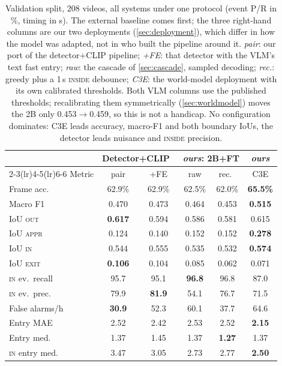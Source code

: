 \documentclass[10pt,twocolumn,letterpaper]{article}
\begin{document}
\begin{table}[t]
\centering
\footnotesize
\setlength{\tabcolsep}{1.9pt}
\begin{tabular}{@{}lccccc@{}}
\toprule
& \multicolumn{2}{c}{Detector+CLIP~\cite{priorsystem2026}} & \multicolumn{2}{c}{\emph{ours}: 2B{+}FT} & \emph{ours} \\
\cmidrule(lr){2-3}\cmidrule(lr){4-5}\cmidrule(lr){6-6}
Metric & pair & {+}FE & raw & rec.\ & C3E \\
\midrule
Frame acc.\ & 62.9\% & 62.9\% & 62.5\% & 62.0\% & \textbf{65.5\%} \\
Macro F1 & 0.470 & 0.473 & 0.464 & 0.453 & \textbf{0.515} \\
\midrule
IoU \textsc{out} & \textbf{0.617} & 0.594 & 0.586 & 0.581 & 0.615 \\
IoU \textsc{appr} & 0.124 & 0.140 & 0.152 & 0.152 & \textbf{0.278} \\
IoU \textsc{in} & 0.544 & 0.555 & 0.535 & 0.532 & \textbf{0.574} \\
IoU \textsc{exit} & \textbf{0.106} & 0.104 & 0.085 & 0.062 & 0.071 \\
\midrule
\textsc{in} ev.\ recall & 95.7 & 95.1 & \textbf{96.8} & 96.8 & 87.0 \\
\textsc{in} ev.\ prec.\ & 79.9 & \textbf{81.9} & 54.1 & 76.7 & 71.5 \\
False alarms/h & \textbf{30.9} & 52.3 & 60.1 & 37.7 & 64.6 \\
\midrule
Entry MAE & 2.52 & 2.42 & 2.53 & 2.52 & \textbf{2.15} \\
Entry med.\ & 1.37 & 1.45 & 1.37 & \textbf{1.27} & 1.37 \\
\textsc{in} entry med.\ & 3.47 & 3.05 & 2.73 & 2.77 & \textbf{2.50} \\
\bottomrule
\end{tabular}
\caption{Validation split, 208 videos, all systems under one protocol (event P/R in \%, timing in s).  The external baseline comes first; the three right-hand columns are our two deployments (\cref{sec:deployment}), which differ in how the model was adapted, not in who built the pipeline around it.  \emph{pair}: our port of the detector+CLIP pipeline; \emph{{+}FE}: that detector with the VLM's text fast entry; \emph{raw}: the cascade of \cref{sec:cascade}, sampled decoding; \emph{rec.}: greedy plus a 1\,s \textsc{inside} debounce; \emph{C3E}: the world-model deployment with its own calibrated thresholds.  Both VLM columns use the published thresholds; recalibrating them symmetrically (\cref{sec:worldmodel}) moves the 2B only 0.453$\to$0.459, so this is not a handicap.  No configuration dominates: C3E leads accuracy, macro-F1 and both boundary IoUs, the detector leads nuisance and \textsc{inside} precision.}
\label{tab:main}
\end{table}
\end{document}

